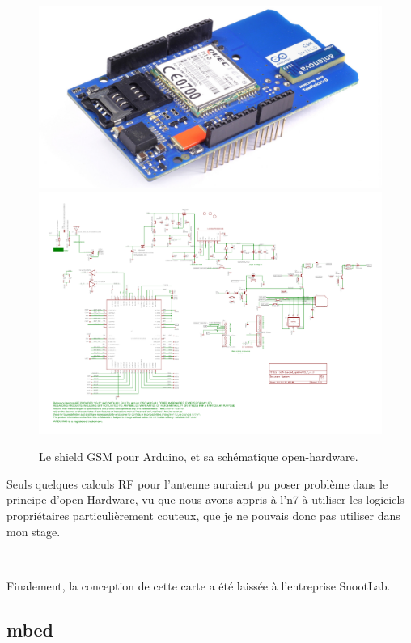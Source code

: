\documentclass{article}
\begin{document}
\begin{figure}[h!]
    \centering\includegraphics[width=\linewidth*2/3]{img/shield_gsm.jpg}
    \centering\includegraphics[width=\linewidth]{img/arduino-gsm-shield-schematic.pdf}
    \caption{Le shield GSM pour Arduino, et sa schématique open-hardware.}
\end{figure}

Seuls quelques calculs RF pour l’antenne auraient pu poser problème dans le principe d’open-Hardware, vu que nous avons appris à l’n7 à utiliser les logiciels propriétaires particulièrement couteux, que je ne pouvais donc pas utiliser dans mon stage.

~

Finalement, la conception de cette carte a été laissée à l’entreprise SnootLab.

\clearpage

\subsection{mbed}
\label{mbed}
\end{document}
